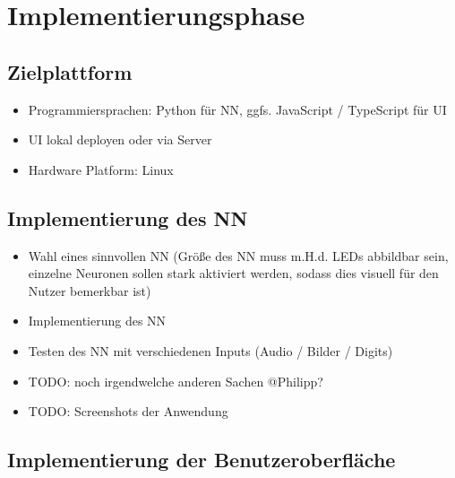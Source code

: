 \clearpage
\section{Implementierungsphase} 
\label{sec:Implementierungsphase}

\subsection{Zielplattform}
\label{sec:Zielplattform}

\begin{itemize}
	\item Programmiersprachen: Python f\"ur NN, ggfs. JavaScript / TypeScript f\"ur UI
	\item UI lokal deployen oder via Server
	\item Hardware Platform: Linux
\end{itemize}
%
%
%
\subsection{Implementierung des NN}
\label{sec:ImplementierungNN}

\begin{itemize}
	\item Wahl eines sinnvollen NN (Gr\"o{\ss}e des NN muss m.H.d. LEDs abbildbar sein, einzelne Neuronen sollen stark aktiviert werden, sodass dies visuell f\"ur den Nutzer bemerkbar ist) 
	\item Implementierung des NN
	\item Testen des NN mit verschiedenen Inputs (Audio / Bilder / Digits)
	\item TODO: noch irgendwelche anderen Sachen @Philipp?
	\item TODO: Screenshots der Anwendung
\end{itemize}


\subsection{Implementierung der Benutzeroberfläche}
\label{sec:ImplementierungBenutzeroberflaeche}

